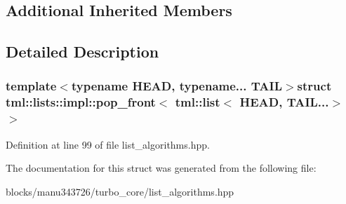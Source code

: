 \subsection*{Additional Inherited Members}


\subsection{Detailed Description}
\subsubsection*{template$<$typename H\+E\+A\+D, typename... T\+A\+I\+L$>$struct tml\+::lists\+::impl\+::pop\+\_\+front$<$ tml\+::list$<$ H\+E\+A\+D, T\+A\+I\+L...$>$ $>$}



Definition at line 99 of file list\+\_\+algorithms.\+hpp.



The documentation for this struct was generated from the following file\+:\begin{DoxyCompactItemize}
\item 
blocks/manu343726/turbo\+\_\+core/list\+\_\+algorithms.\+hpp\end{DoxyCompactItemize}
